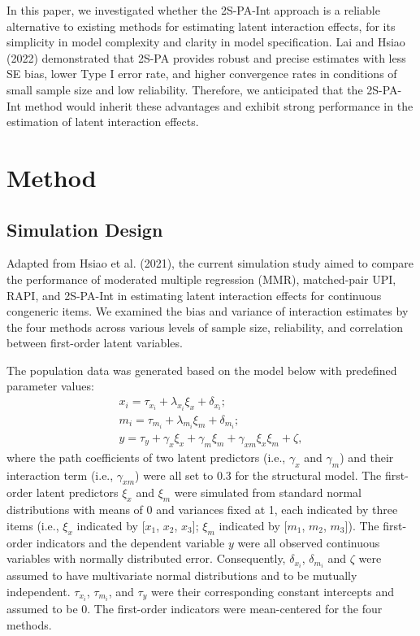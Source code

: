 \documentclass[
  man]{apa6}
\begin{document}
In this paper, we investigated whether the 2S-PA-Int approach is a reliable alternative to existing methods for estimating latent interaction effects, for its simplicity in model complexity and clarity in model specification. Lai and Hsiao (2022) demonstrated that 2S-PA provides robust and precise estimates with less SE bias, lower Type I error rate, and higher convergence rates in conditions of small sample size and low reliability. Therefore, we anticipated that the 2S-PA-Int method would inherit these advantages and exhibit strong performance in the estimation of latent interaction effects.

\section{Method}\label{method}

\subsection{Simulation Design}\label{simulation-design}

Adapted from Hsiao et al. (2021), the current simulation study aimed to compare the performance of moderated multiple regression (MMR), matched-pair UPI, RAPI, and 2S-PA-Int in estimating latent interaction effects for continuous congeneric items. We examined the bias and variance of interaction estimates by the four methods across various levels of sample size, reliability, and correlation between first-order latent variables.

The population data was generated based on the model below with predefined parameter values:
\begin{equation}
\begin{gathered}
x_{i} =  \tau_{x_{i}} + \lambda_{x_{i}}\xi_{x} + \delta_{x_{i}};\\
m_{i} =  \tau_{m_{i}} + \lambda_{m_{i}}\xi_{m} + \delta_{m_{i}};\\
y =  \tau_{y} + \gamma_{x}\xi_{x} + \gamma_{m}\xi_{m} + \gamma_{xm}\xi_{x}\xi_{m} + \zeta,
\end{gathered}
\end{equation}
where the path coefficients of two latent predictors (i.e., \(\gamma_{x}\) and \(\gamma_{m}\)) and their interaction term (i.e., \(\gamma_{xm}\)) were all set to 0.3 for the structural model. The first-order latent predictors \(\xi_{x}\) and \(\xi_{m}\) were simulated from standard normal distributions with means of 0 and variances fixed at 1, each indicated by three items (i.e., \(\xi_{x}\) indicated by {[}\(x_{1}\), \(x_{2}\), \(x_{3}\){]}; \(\xi_{m}\) indicated by {[}\(m_{1}\), \(m_{2}\), \(m_{3}\){]}). The first-order indicators and the dependent variable \(y\) were all observed continuous variables with normally distributed error. Consequently, \(\delta_{x_{i}}\), \(\delta_{m_{i}}\) and \(\zeta\) were assumed to have multivariate normal distributions and to be mutually independent. \(\tau_{x_{i}}\), \(\tau_{m_{i}}\), and \(\tau_{y}\) were their corresponding constant intercepts and assumed to be 0. The first-order indicators were mean-centered for the four methods.
\end{document}
